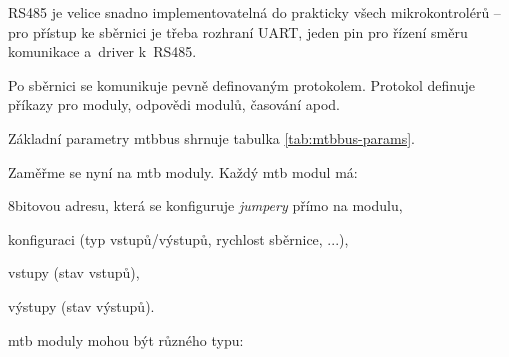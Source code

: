 RS485 je velice snadno implementovatelná do prakticky všech mikrokontrolérů –
pro přístup ke sběrnici je třeba rozhraní UART, jeden pin pro řízení směru
komunikace a~driver k~RS485.

Po sběrnici se komunikuje pevně definovaným protokolem. Protokol definuje
příkazy pro moduly, odpovědi modulů, časování apod. \cite{mtbbus-specs}

Základní parametry \gls{mtbbus} shrnuje tabulka \ref{tab:mtbbus-params}.

Zaměřme se nyní na \gls{mtb} moduly. Každý \gls{mtb} modul má:

\begin{compactenum}
\item 8bitovou adresu, která se konfiguruje \textit{jumpery} přímo na modulu,
\item konfiguraci (typ vstupů/výstupů, rychlost sběrnice, ...),
\item vstupy (stav vstupů),
\item výstupy (stav výstupů).
\end{compactenum}

\gls{mtb} moduly mohou být různého typu:

